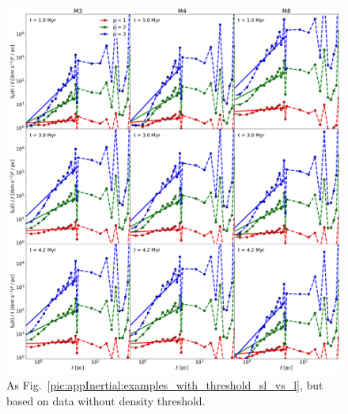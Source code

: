 \documentclass{aa}		%
\begin{document}
 	
\begin{figure}
    \centering
    \includegraphics[width=\textwidth]{app_examples_woutthres_sl_l.pdf}
    \caption{
        As Fig.~\ref{pic:appInertial:examples_with_threshold_sl_vs_l}, but based on data without density threshold.
    }
    \label{pic:appInertial:examples_without_threshold_sl_vs_l}
\end{figure}
\end{document}
